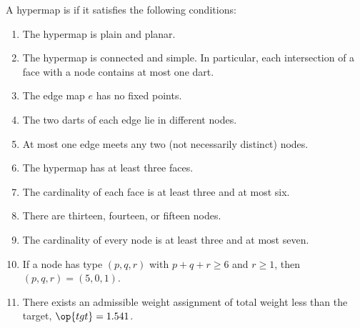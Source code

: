 \begin{definition}[tame]\label{def:tame}
A hypermap is  if it satisfies the following conditions:
%
%
\begin{enumerate}\wasitemize 
\item {}  
The hypermap is plain and planar.
\item {} 
The hypermap is connected and simple.  In
  particular, each intersection of a face with a node contains at
  most one dart.
\item {} 
The edge map $e$ has no fixed points.
\item {} 
The two darts of each edge lie in different nodes.
\item {} 
At most one edge meets any two (not necessarily distinct) nodes.
\item {} 
  The hypermap has at least three faces.
\item {}
The cardinality of each face is at least three  and at most six.
\item {} 
There are  thirteen, fourteen, or fifteen nodes.
\item {} 
The cardinality of every node is at least three
  and at most seven.
\item {} 
If a node has type $(p,q,r)$ with $p+q+r\ge 6$ and $r\ge 1$, then $(p,q,r)=(5,0,1)$. 
\item {} 
There exists an admissible weight assignment
of total weight less than the target, $\op{tgt}=1.541$.
\end{enumerate}\wasitemize 
\end{definition}
%
%
%
%
%
%
%
%

